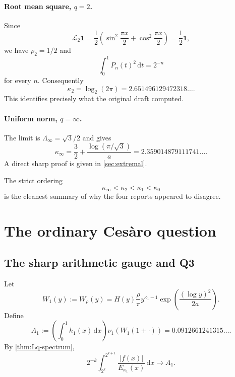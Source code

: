 \documentclass[11pt,oneside]{article}
\theoremstyle{definition}
\theoremstyle{remark}
\newcommand{\dd}{\,\mathrm d}
\newcommand{\Lop}{\mathcal L}
\begin{document}
\paragraph{Root mean square, $q=2$.}
Since
\begin{equation}
 \Lop_2\mathbf1
 =\frac12\left(\sin^2\frac{\pi x}{2}
 +\cos^2\frac{\pi x}{2}\right)=\frac12\mathbf1,
 \label{eq:L2-one}
\end{equation}
we have $\rho_2=1/2$ and
\begin{equation}
 \int_0^1P_n(t)^2\dd t=2^{-n}
 \label{eq:L2-exact}
\end{equation}
for every $n$.  Consequently
\begin{equation}
 \boxed{\kappa_2=\log_2(2\pi)=2.651496129472318\ldots .}
 \label{eq:kappa2}
\end{equation}
This identifies precisely what the original draft computed.

\paragraph{Uniform norm, $q=\infty$.}
The limit is
$\Lambda_\infty=\sqrt3/2$ and gives
\begin{equation}
 \boxed{
 \kappa_\infty
 =\frac32+\frac{\log(\pi/\sqrt3)}a
 =2.359014879111741\ldots .}
 \label{eq:kappa-infty}
\end{equation}
A direct sharp proof is given in \cref{sec:extremal}.

The strict ordering
\begin{equation}
 \kappa_\infty<\kappa_2<\kappa_1<\kappa_0
 \label{eq:kappa-order}
\end{equation}
is the cleanest summary of why the four reports appeared to disagree.

\section{The ordinary Ces\`aro question}
\label{sec:Cesaro}

\subsection{The sharp arithmetic gauge and Q3}

Let
\begin{equation}
 W_1(y):=W_\rho(y)
 =H(y)\frac{\rho}{\pi}
 y^{\kappa_1-1}
 \exp\!\left(\frac{(\log y)^2}{2a}\right).
 \label{eq:W1}
\end{equation}
Define
\begin{equation}
 A_1:=
 \left(\int_0^1h_1(x)\dd x\right)
 \nu_1\!\left(W_1(1+\cdot)\right)
 =0.0912661241315\ldots .
 \label{eq:A1}
\end{equation}
By \cref{thm:Lq-spectrum},
\begin{equation}
 2^{-k}\int_{2^k}^{2^{k+1}}
 \frac{|f(x)|}{E_{\kappa_1}(x)}\dd x
 \longrightarrow A_1.
 \label{eq:L1-shell-limit}
\end{equation}
\end{document}
